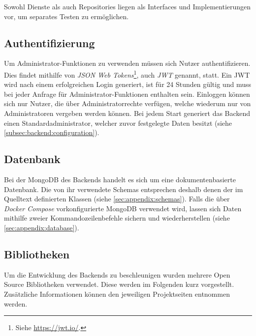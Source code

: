 Sowohl Dienste als auch Repositories liegen als Interfaces und Implementierungen vor, um separates Testen zu ermöglichen.

\subsection{Authentifizierung}
\label{subsec:backend:authentication}
Um Administrator-Funktionen zu verwenden müssen sich Nutzer authentifizieren.
Dies findet mithilfe von \textit{JSON Web Tokens}\footnote{Siehe \url{https://jwt.io/}.}, auch \textit{JWT} genannt, statt.
Ein JWT wird nach einem erfolgreichen Login generiert, ist für 24 Stunden gültig und muss bei jeder Anfrage für Administrator-Funktionen enthalten sein.
Einloggen können sich nur Nutzer, die über Administratorrechte verfügen, welche wiederum nur von Administratoren vergeben werden können.
Bei jedem Start generiert das Backend einen Standard\-administrator, welcher zuvor festgelegte Daten besitzt (siehe \autoref{subsec:backend:configuration}).

\subsection{Datenbank}
\label{subsec:backend:database}
Bei der MongoDB des Backends handelt es sich um eine dokumentenbasierte Datenbank.
Die von ihr verwendete Schemas entsprechen deshalb denen der im Quelltext definierten Klassen (siehe \autoref{sec:appendix:schemas}).
Falls die über \textit{Docker Compose} vorkonfigurierte MongoDB verwendet wird, lassen sich Daten mithilfe zweier Kommandozeilenbefehle sichern und wiederherstellen (siehe \autoref{sec:appendix:database}).

\subsection{Bibliotheken}
\label{subsec:backend:bibs}
Um die Entwicklung des Backends zu beschleunigen wurden mehrere Open Source Bibliotheken verwendet.
Diese werden im Folgenden kurz vorgestellt.
Zusätzliche Informationen können den jeweiligen Projektseiten entnommen werden.

